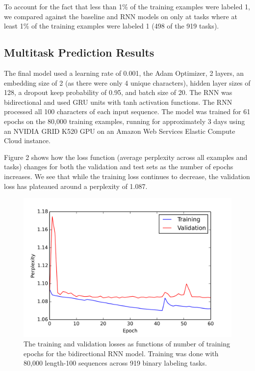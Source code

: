 \documentclass{article} %
\begin{document}
To account for the fact that less than 1\% of the training examples were labeled 1, we compared against the baseline and RNN models on only at tasks where at least 1\% of the training examples were labeled 1 (498 of the 919 tasks).

\subsection{Multitask Prediction Results}

The final model used a learning rate of 0.001, the Adam Optimizer, 2 layers, an embedding size of 2 (as there were only 4 unique characters), hidden layer sizes of 128, a dropout keep probability of 0.95, and batch size of 20. The RNN was bidirectional and used GRU units with tanh activation functions. The RNN processed all 100 characters of each input sequence. The model was trained for 61 epochs on the 80,000 training examples, running for approximately 3 days using an NVIDIA GRID K520 GPU on an Amazon Web Services Elastic Compute Cloud instance.

Figure 2 shows how the loss function (average perplexity across all examples and tasks) changes for both the validation and test sets as the number of epochs increases. We see that while the training loss continues to decrease, the validation loss has plateaued around a perplexity of 1.087.

\begin{figure}[!htb]
	\centering
	\includegraphics[scale=0.6]{loss_100}
	\caption{The training and validation losses as functions of number of training epochs for the bidirectional RNN model. Training was done with 80,000 length-100 sequences across 919 binary labeling tasks.}
\end{figure}
\end{document}
